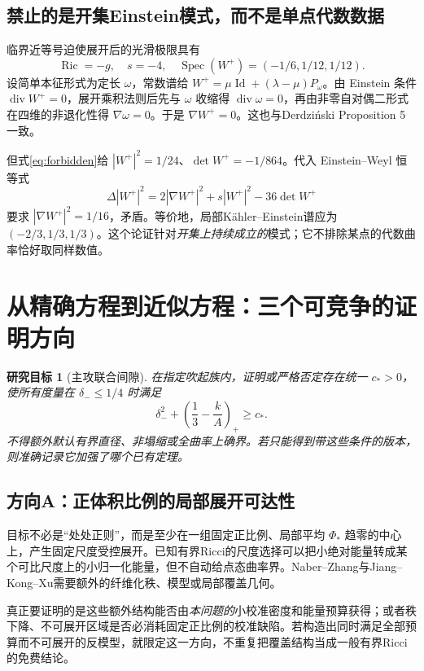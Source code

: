 \documentclass[UTF8,a4paper,11pt,fontset=fandol]{ctexart}
\numberwithin{equation}{section}
\newtheorem{target}[theorem]{研究目标}
\theoremstyle{definition}
\newcommand{\Ric}{\operatorname{Ric}}
\newcommand{\spec}{\operatorname{Spec}}
\newcommand{\Id}{\operatorname{Id}}
\begin{document}
\subsection{禁止的是开集Einstein模式，而不是单点代数数据}
临界近等号迫使展开后的光滑极限具有
\begin{equation}\label{eq:forbidden}
\Ric=-g,\quad s=-4,\quad
\spec(W^+)=(-1/6,1/12,1/12).
\end{equation}
设简单本征形式为定长 $\omega$，常数谱给 $W^+=\mu\Id+(\lambda-\mu)P_\omega$。由 Einstein 条件 $\operatorname{div}W^+=0$，展开乘积法则后先与 $\omega$ 收缩得 $\operatorname{div}\omega=0$，再由非零自对偶二形式在四维的非退化性得 $\nabla\omega=0$。于是 $\nabla W^+=0$。这也与Derdzi\'nski Proposition 5一致\cite{Derdzinski}。

但式\eqref{eq:forbidden}给 $|W^+|^2=1/24$、$\det W^+=-1/864$。代入 Einstein--Weyl 恒等式
\[
\Delta|W^+|^2=2|\nabla W^+|^2+s|W^+|^2-36\det W^+
\]
要求 $|\nabla W^+|^2=1/16$，矛盾。等价地，局部K\"ahler--Einstein谱应为 $(-2/3,1/3,1/3)$。这个论证针对\emph{开集上持续成立的}模式；它不排除某点的代数曲率恰好取同样数值。

\section{从精确方程到近似方程：三个可竞争的证明方向}
\begin{target}[主攻联合间隙]\label{tar:joint}
在指定吹起族内，证明或严格否定存在统一 $c_*>0$，使所有度量在 $\delta_-\le1/4$ 时满足
\begin{equation}\label{eq:joint}
\delta_-^2+\left(\frac13-\frac{k}{A}\right)_+\ge c_*.
\end{equation}
不得额外默认有界直径、非塌缩或全曲率上确界。若只能得到带这些条件的版本，则准确记录它加强了哪个已有定理。
\end{target}

\subsection{方向A：正体积比例的局部展开可达性}
目标不必是“处处正则”，而是至少在一组固定正比例、局部平均 $\Phi_*$ 趋零的中心上，产生固定尺度受控展开。已知有界Ricci的尺度选择\cite[Theorem 3.4]{GJ2017}可以把小绝对能量转成某个可比尺度上的小归一化能量，但不自动给点态曲率界。Naber--Zhang与Jiang--Kong--Xu需要额外的纤维化秩、模型或局部覆盖几何\cite{NZ,JKX}。

真正要证明的是这些额外结构能否由\emph{本问题的}小校准密度和能量预算获得；或者秩下降、不可展开区域是否必消耗固定正比例的校准缺陷。若构造出同时满足全部预算而不可展开的反模型，就限定这一方向，不重复把覆盖结构当成一般有界Ricci的免费结论。
\end{document}
